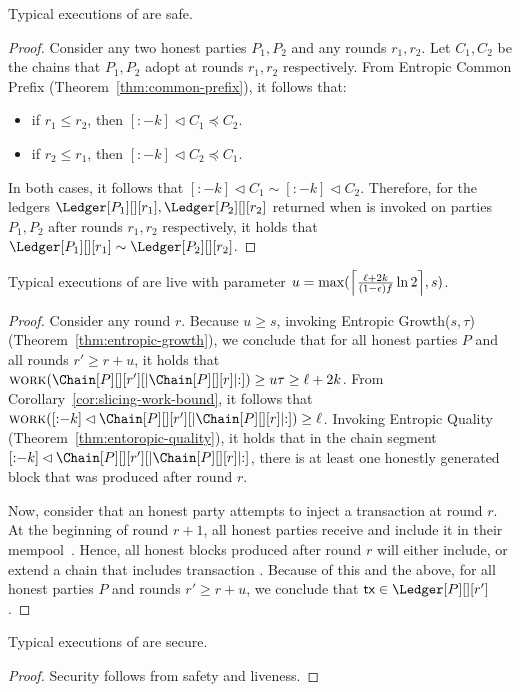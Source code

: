 \begin{conjecture}
  Typical executions of \poem are safe.
\end{conjecture}
\begin{proof}
  Consider any two honest parties $P_1, P_2$ and
  any rounds $r_1, r_2$. Let $C_1, C_2$ be the chains that $P_1, P_2$
  adopt at rounds $r_1, r_2$ respectively.
  From Entropic Common Prefix (Theorem~\ref{thm:common-prefix}), it follows that:
  \begin{itemize}
    \item if $r_1 \leq r_2$, then $[{:}{-k}] \lhd C_1 \preccurlyeq C_2$.
    \item if $r_2 \leq r_1$, then $[{:}{-k}] \lhd C_2 \preccurlyeq C_1$.
  \end{itemize}
  In both cases, it follows that $[{:}{-k}] \lhd C_1 \sim [{:}{-k}] \lhd C_2$.
  Therefore, for the ledgers $\Ledger[P_1][][r_1], \Ledger[P_2][][r_2]$ returned when
  \lread is invoked on parties $P_1, P_2$ after rounds $r_1, r_2$ respectively,
  it holds that $\Ledger[P_1][][r_1] \sim \Ledger[P_2][][r_2]$.
\end{proof}

\begin{conjecture}
  Typical executions of \poem are live with parameter $u = \max(\ceil*{\frac{\ell + 2k}{(1 - \epsilon) f} \ln2}, s)$.
\end{conjecture}
\begin{proof}
  Consider any round $r$.
  Because $u \geq s$, invoking Entropic Growth($s, \tau$) (Theorem~\ref{thm:entropic-growth}), we conclude that
  for all honest parties $P$ and all rounds $r' \geq r + u$, it holds that
  $\work(\Chain[P][][r'][|\Chain[P][][r]|{:}]) \geq u \tau \geq \ell + 2k$.
  From Corollary~\ref{cor:slicing-work-bound}, it follows that
  $\work([{:}{-k}] \lhd \Chain[P][][r'][|\Chain[P][][r]|{:}]) \geq \ell$.
  Invoking Entropic Quality (Theorem~\ref{thm:entoropic-quality}),
  it holds that in the chain segment $[{:}{-k}] \lhd \Chain[P][][r'][|\Chain[P][][r]|{:}]$,
  there is at least one honestly generated block that was produced after round $r$.

  Now, consider that an honest party attempts to inject a transaction \tx
  at round $r$. At the beginning of round $r + 1$, all honest parties
  receive \tx and include it in their mempool~\cite[Section 5.7]{blockchain-foundations}.
  Hence, all honest blocks produced
  after round $r$ will either include, or extend a chain that includes transaction \tx.
  Because of this and the above, for all honest parties $P$ and rounds $r' \geq r + u$,
  we conclude that $\tx \in \Ledger[P][][r']$.
  \Qed
\end{proof}

\begin{corollary}
  Typical executions of \poem are secure.
\end{corollary}
\begin{proof}
  Security follows from safety and liveness.
  \Qed
\end{proof}
